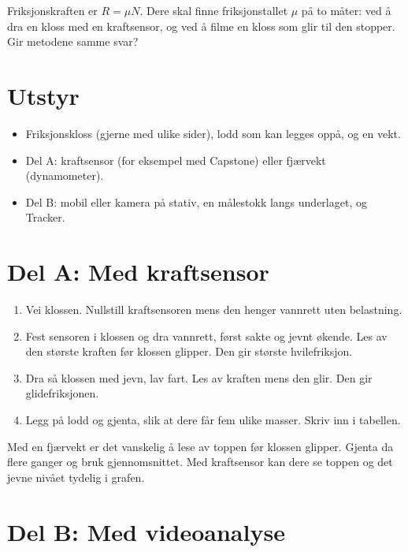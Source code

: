 \documentclass[11pt]{article}
\begin{document}

Friksjonskraften er $R = μN$. Dere skal finne friksjonstallet $μ$ på to måter: ved å dra en kloss med en kraftsensor, og ved å filme en kloss som glir til den stopper. Gir metodene samme svar?

\section*{Utstyr}

\begin{itemize}
\item Friksjonskloss (gjerne med ulike sider), lodd som kan legges oppå, og en vekt.
\item Del A: kraftsensor (for eksempel med Capstone) eller fjærvekt (dynamometer).
\item Del B: mobil eller kamera på stativ, en målestokk langs underlaget, og Tracker.
\end{itemize}

\section*{Del A: Med kraftsensor}

\begin{enumerate}
\item Vei klossen. Nullstill kraftsensoren mens den henger vannrett uten belastning.
\item Fest sensoren i klossen og dra vannrett, først sakte og jevnt økende. Les av den største kraften før klossen glipper. Den gir største hvilefriksjon.
\item Dra så klossen med jevn, lav fart. Les av kraften mens den glir. Den gir glidefriksjonen.
\item Legg på lodd og gjenta, slik at dere får fem ulike masser. Skriv inn i tabellen.
\end{enumerate}

Med en fjærvekt er det vanskelig å lese av toppen før klossen glipper. Gjenta da flere ganger og bruk gjennomsnittet. Med kraftsensor kan dere se toppen og det jevne nivået tydelig i grafen.

\section*{Del B: Med videoanalyse}
\end{document}

